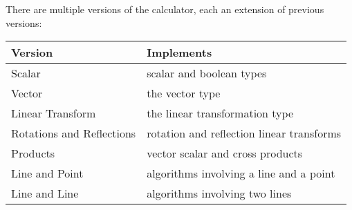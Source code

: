 \documentclass[12pt]{article}
\begin{document}
\newpage

There are multiple versions of the calculator, each an extension
of previous versions:
\begin{center}
\small
\begin{tabular}{ll}
Version & Implements
\\\hline
Scalar	& scalar and boolean types \\
Vector  & the vector type \\
Linear Transform & the linear transformation type \\
Rotations and Reflections & rotation and reflection linear transforms \\
Products & vector scalar and cross products \\
Line and Point & algorithms involving a line and a point \\
Line and Line & algorithms involving two lines \\
\end{tabular}
\end{center}
\end{document}
